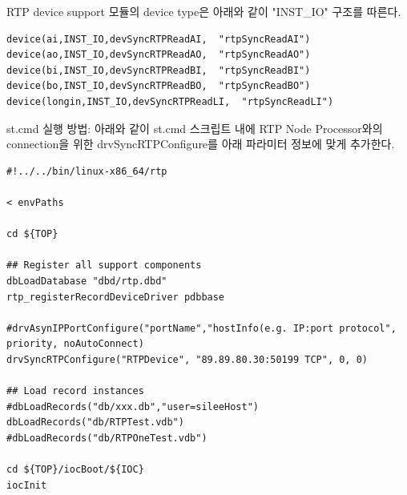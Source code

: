 \documentclass[11pt
  , a4paper
  , article
  , oneside
]{memoir}
\begin{document}
RTP device support 모듈의 device type은 아래와 같이 "INST\_IO" 구조를 따른다.
\begin{lstlisting}[style=termstyle]
device(ai,INST_IO,devSyncRTPReadAI,  "rtpSyncReadAI")
device(ao,INST_IO,devSyncRTPReadAO,  "rtpSyncReadAO")
device(bi,INST_IO,devSyncRTPReadBI,  "rtpSyncReadBI")
device(bo,INST_IO,devSyncRTPReadBO,  "rtpSyncReadBO")
device(longin,INST_IO,devSyncRTPReadLI,  "rtpSyncReadLI")
\end{lstlisting}


st.cmd 실행 방법:
아래와 같이 st.cmd 스크립트 내에 RTP Node Processor와의 connection을 위한 drvSyncRTPConfigure를 아래 파라미터 정보에 맞게 추가한다.

\begin{lstlisting}[style=termstyle]
#!../../bin/linux-x86_64/rtp

< envPaths

cd ${TOP}

## Register all support components
dbLoadDatabase "dbd/rtp.dbd"
rtp_registerRecordDeviceDriver pdbbase

#drvAsynIPPortConfigure("portName","hostInfo(e.g. IP:port protocol", priority, noAutoConnect)
drvSyncRTPConfigure("RTPDevice", "89.89.80.30:50199 TCP", 0, 0)

## Load record instances
#dbLoadRecords("db/xxx.db","user=sileeHost")
dbLoadRecords("db/RTPTest.vdb")
#dbLoadRecords("db/RTPOneTest.vdb")

cd ${TOP}/iocBoot/${IOC}
iocInit
\end{lstlisting}

\clearpage


\end{document}

